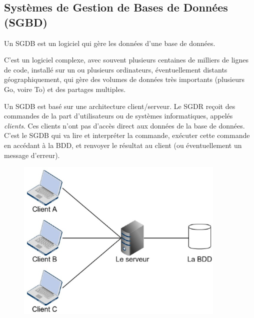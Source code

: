 \documentclass[11pt,a4paper,french,twoside]{PMCours}
\begin{document}
\subsection{Systèmes de Gestion de Bases de Données (SGBD)}

\begin{Definition}{}
Un SGDB est un logiciel qui gère les données d'une base de données. 
\end{Definition}

C'est un logiciel complexe, avec souvent plusieurs centaines de milliers de lignes de code, installé sur un ou plusieurs ordinateurs, éventuellement distants géographiquement, qui gère des volumes de données très importants (plusieurs Go, voire To) et des partages multiples. 

Un SGDB est basé sur une architecture client/serveur. Le SGDR reçoit des commandes de la part d'utilisateurs ou de systèmes informatiques, appelés \emph{clients}. Ces clients n'ont pas d'accès direct aux données de la base de données. C'est le SGDB qui va lire et interpréter la commande, exécuter cette commande en accédant à la BDD, et renvoyer le résultat au client (ou éventuellement un message d'erreur).

\newpage 

\begin{figure}[ht]
\centering
\includegraphics[width=10cm]{clientserveur.eps}
\end{figure}
\end{document}
